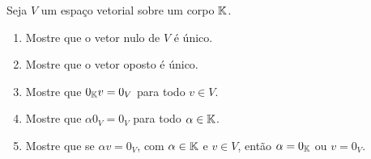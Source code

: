 \documentclass[12pt]{exam}
\begin{document}
\begin{exercicio}
  Seja $V$ um espa\c{c}o vetorial sobre um corpo $\mathbb{K}$.
  \begin{enumerate}[label={\alph*})]
    \item Mostre que o vetor nulo de $V$ \'e \'unico.
    \item Mostre que o vetor oposto \'e \'unico.
    \item Mostre que $0_{\mathbb{K}} v = 0_V$ para todo $v \in V$.
    \item Mostre que $\alpha 0_V = 0_V$ para todo $\alpha \in \mathbb{K}$.
    \item Mostre que se $\alpha v = 0_V$, com $\alpha \in \mathbb{K}$ e $v \in V$, ent\~ao $\alpha = 0_{\mathbb{K}}$ ou $v = 0_V$.
  \end{enumerate}
\end{exercicio}

%
\end{document}
